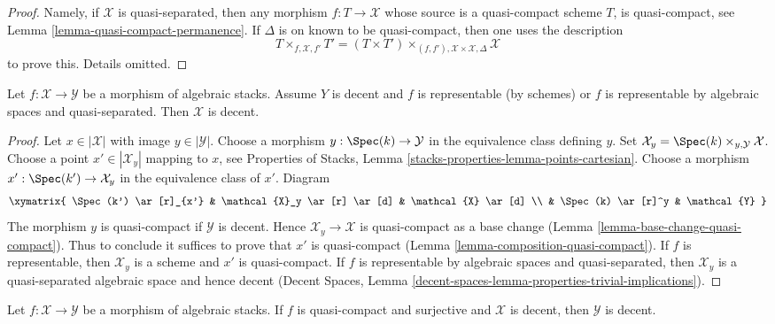 \begin{proof}
Namely, if $\mathcal{X}$ is quasi-separated, then
any morphism $f : T \to \mathcal{X}$ whose source is a
quasi-compact scheme $T$, is quasi-compact, see
Lemma \ref{lemma-quasi-compact-permanence}.
If $\Delta$ is on known to be quasi-compact, then one uses the
description
$$
T \times_{f, \mathcal{X}, f'} T' =
(T \times T')
\times_{(f, f'), \mathcal{X} \times \mathcal{X}, \Delta}
\mathcal{X}
$$
to prove this. Details omitted.
\end{proof}

\begin{lemma}
\label{lemma-representable-decent}
Let $f : \mathcal{X} \to \mathcal{Y}$ be a morphism
of algebraic stacks. Assume $Y$ is decent
and $f$ is representable (by schemes) or $f$ is representable
by algebraic spaces and quasi-separated.
Then $\mathcal{X}$ is decent.
\end{lemma}

\begin{proof}
Let $x \in |\mathcal{X}|$ with image $y \in |\mathcal{Y}|$.
Choose a morphism $y : \Spec(k) \to \mathcal{Y}$
in the equivalence class defining $y$.
Set $\mathcal{X}_y = \Spec(k) \times_{y, \mathcal{Y}} \mathcal{X}$.
Choose a point $x' \in |\mathcal{X}_y|$ mapping to $x$, see
Properties of Stacks, Lemma \ref{stacks-properties-lemma-points-cartesian}.
Choose a morphism $x' : \Spec(k') \to \mathcal{X}_y$ in the equivalence
class of $x'$. Diagram
$$
\xymatrix{
\Spec(k') \ar[r]_{x'} &
\mathcal{X}_y \ar[r] \ar[d] &
\mathcal{X} \ar[d] \\
&
\Spec(k) \ar[r]^y &
\mathcal{Y}
}
$$
The morphism $y$ is quasi-compact if $\mathcal{Y}$ is decent.
Hence $\mathcal{X}_y \to \mathcal{X}$ is quasi-compact as a base change
(Lemma \ref{lemma-base-change-quasi-compact}).
Thus to conclude it suffices to prove that $x'$ is quasi-compact
(Lemma \ref{lemma-composition-quasi-compact}).
If $f$ is representable, then $\mathcal{X}_y$ is a scheme
and $x'$ is quasi-compact.
If $f$ is representable by algebraic spaces and quasi-separated,
then $\mathcal{X}_y$ is a quasi-separated algebraic space
and hence decent (Decent Spaces, Lemma
\ref{decent-spaces-lemma-properties-trivial-implications}).
\end{proof}

\begin{lemma}
\label{lemma-qc-decent}
Let $f : \mathcal{X} \to \mathcal{Y}$ be a morphism of algebraic stacks.
If $f$ is quasi-compact and surjective and $\mathcal{X}$ is decent,
then $\mathcal{Y}$ is decent.
\end{lemma}

